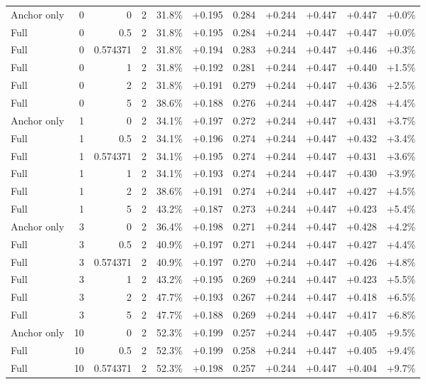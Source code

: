 \begin{table}[htbp]
\begin{tabular}{lrrrccccccc}
Anchor only & 0 & 0 & 2 & 31.8\% & +0.195 & 0.284 & +0.244 & +0.447 & +0.447 & +0.0\% \\
Full & 0 & 0.5 & 2 & 31.8\% & +0.195 & 0.284 & +0.244 & +0.447 & +0.447 & +0.0\% \\
Full & 0 & 0.574371 & 2 & 31.8\% & +0.194 & 0.283 & +0.244 & +0.447 & +0.446 & +0.3\% \\
Full & 0 & 1 & 2 & 31.8\% & +0.192 & 0.281 & +0.244 & +0.447 & +0.440 & +1.5\% \\
Full & 0 & 2 & 2 & 31.8\% & +0.191 & 0.279 & +0.244 & +0.447 & +0.436 & +2.5\% \\
Full & 0 & 5 & 2 & 38.6\% & +0.188 & 0.276 & +0.244 & +0.447 & +0.428 & +4.4\% \\
Anchor only & 1 & 0 & 2 & 34.1\% & +0.197 & 0.272 & +0.244 & +0.447 & +0.431 & +3.7\% \\
Full & 1 & 0.5 & 2 & 34.1\% & +0.196 & 0.274 & +0.244 & +0.447 & +0.432 & +3.4\% \\
Full & 1 & 0.574371 & 2 & 34.1\% & +0.195 & 0.274 & +0.244 & +0.447 & +0.431 & +3.6\% \\
Full & 1 & 1 & 2 & 34.1\% & +0.193 & 0.274 & +0.244 & +0.447 & +0.430 & +3.9\% \\
Full & 1 & 2 & 2 & 38.6\% & +0.191 & 0.274 & +0.244 & +0.447 & +0.427 & +4.5\% \\
Full & 1 & 5 & 2 & 43.2\% & +0.187 & 0.273 & +0.244 & +0.447 & +0.423 & +5.4\% \\
Anchor only & 3 & 0 & 2 & 36.4\% & +0.198 & 0.271 & +0.244 & +0.447 & +0.428 & +4.2\% \\
Full & 3 & 0.5 & 2 & 40.9\% & +0.197 & 0.271 & +0.244 & +0.447 & +0.427 & +4.4\% \\
Full & 3 & 0.574371 & 2 & 40.9\% & +0.197 & 0.270 & +0.244 & +0.447 & +0.426 & +4.8\% \\
Full & 3 & 1 & 2 & 43.2\% & +0.195 & 0.269 & +0.244 & +0.447 & +0.423 & +5.5\% \\
Full & 3 & 2 & 2 & 47.7\% & +0.193 & 0.267 & +0.244 & +0.447 & +0.418 & +6.5\% \\
Full & 3 & 5 & 2 & 47.7\% & +0.188 & 0.269 & +0.244 & +0.447 & +0.417 & +6.8\% \\
Anchor only & 10 & 0 & 2 & 52.3\% & +0.199 & 0.257 & +0.244 & +0.447 & +0.405 & +9.5\% \\
Full & 10 & 0.5 & 2 & 52.3\% & +0.199 & 0.258 & +0.244 & +0.447 & +0.405 & +9.4\% \\
Full & 10 & 0.574371 & 2 & 52.3\% & +0.198 & 0.257 & +0.244 & +0.447 & +0.404 & +9.7\% \\

\end{tabular}
\end{table}

